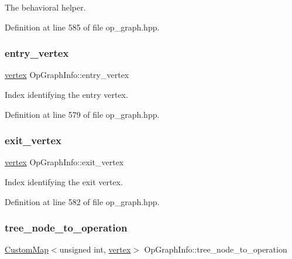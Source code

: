 The behavioral helper. 



Definition at line 585 of file op\+\_\+graph.\+hpp.

\mbox{\label{structOpGraphInfo_ab986e971bdcdfa929d9eb4f454b3b8ce}} 
\subsubsection{\texorpdfstring{entry\+\_\+vertex}{entry\_vertex}}
{\footnotesize\ttfamily \hyperlink{graph_8hpp_abefdcf0544e601805af44eca032cca14}{vertex} Op\+Graph\+Info\+::entry\+\_\+vertex}



Index identifying the entry vertex. 



Definition at line 579 of file op\+\_\+graph.\+hpp.

\mbox{\label{structOpGraphInfo_a8d7ba1cb3875b2d3ba8554ff3664163b}} 
\subsubsection{\texorpdfstring{exit\+\_\+vertex}{exit\_vertex}}
{\footnotesize\ttfamily \hyperlink{graph_8hpp_abefdcf0544e601805af44eca032cca14}{vertex} Op\+Graph\+Info\+::exit\+\_\+vertex}



Index identifying the exit vertex. 



Definition at line 582 of file op\+\_\+graph.\+hpp.

\mbox{\label{structOpGraphInfo_a5690c4f8ca5dc0dc6a1fe4faa5d5ef3d}} 
\subsubsection{\texorpdfstring{tree\+\_\+node\+\_\+to\+\_\+operation}{tree\_node\_to\_operation}}
{\footnotesize\ttfamily \hyperlink{custom__map_8hpp_a18ca01763abbe3e5623223bfe5aaac6b}{Custom\+Map}$<$unsigned int, \hyperlink{graph_8hpp_abefdcf0544e601805af44eca032cca14}{vertex}$>$ Op\+Graph\+Info\+::tree\+\_\+node\+\_\+to\+\_\+operation}



